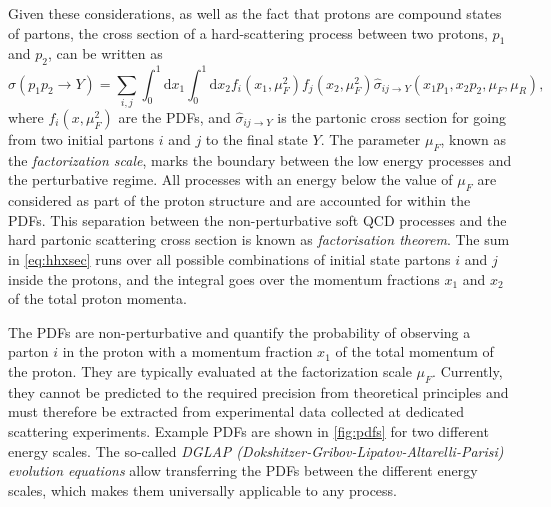 Given these considerations, as well as the fact that protons are compound states of partons, the cross section of a hard-scattering process between two protons, $p_1$ and $p_2$, can be written as~\cite{Ellis:1991qj}
\begin{equation}
  \sigma(p_1p_2 \to Y) = \sum_{i,j} \int_0^1 \mathrm{d}x_1 \int_0^1 \mathrm{d}x_2 f_i(x_1,\mu_F^2) f_j(x_2,\mu_F^2) \hat{\sigma}_{ij \rightarrow Y}(x_1p_1,x_2p_2,\mu_F,\mu_R), 
  \label{eq:hhxsec}
\end{equation}
where $f_i(x,\mu_F^2)$ are the PDFs, and $\hat{\sigma}_{ij \rightarrow Y}$ is the partonic cross section for going from two initial partons $i$ and $j$ to the final state $Y$.
The parameter $\mu_F$, known as the \emph{factorization scale}, marks the boundary between the low energy processes and the perturbative regime. 
All processes with an energy below the value of $\mu_F$ are considered as part of the proton structure and are accounted for within the PDFs. 
This separation between the non-perturbative soft QCD processes and the hard partonic scattering cross section is known as \emph{factorisation theorem}.
The sum in \cref{eq:hhxsec} runs over all possible combinations of initial state partons $i$ and $j$ inside the protons, and the integral goes over the momentum fractions $x_1$ and $x_2$ of the total proton momenta.

The PDFs are non-perturbative and quantify the probability of observing a parton $i$ in the proton with a momentum fraction $x_1$ of the total momentum of the proton.
They are typically evaluated at the factorization scale $\mu_F$. 
Currently, they cannot be predicted to the required precision from theoretical principles and must therefore be extracted from experimental data collected at dedicated scattering experiments.
Example PDFs are shown in \cref{fig:pdfs} for two different energy scales.
The so-called \emph{DGLAP (Dokshitzer-Gribov-Lipatov-Altarelli-Parisi) evolution equations} \cite{Dokshitzer:1977sg,GRIBOV197178,Altarelli:1977zs} allow transferring the PDFs between the different energy scales, which makes them universally applicable to any process. 


